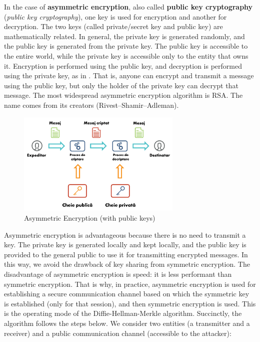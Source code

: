 In the case of \textbf{asymmetric encryption}, also called \textbf{public key cryptography} (\textit{public key cryptography}), one key is used for encryption and another for decryption.
The two keys (called private/secret key and public key) are mathematically related.
In general, the private key is generated randomly, and the public key is generated from the private key.
The public key is accessible to the entire world, while the private key is accessible only to the entity that owns it.
Encryption is performed using the public key, and decryption is performed using the private key, as in .
That is, anyone can encrypt and transmit a message using the public key, but only the holder of the private key can decrypt that message.
The most widespread asymmetric encryption algorithm is RSA.
The name comes from its creators (Rivest–Shamir–Adleman).

\begin{figure}[htbp]
  \centering
  \def\svgwidth{\columnwidth}
  \includegraphics[width=0.7\textwidth]{chapters/12-auth/img/asymmetric-encryption.svg.pdf}
  \caption{Asymmetric Encryption (with public keys)}
  \label{fig:sec:asymmetric-encryption}
\end{figure}

Asymmetric encryption is advantageous because there is no need to transmit a key.
The private key is generated locally and kept locally, and the public key is provided to the general public to use it for transmitting encrypted messages.
In this way, we avoid the drawback of key sharing from symmetric encryption.
The disadvantage of asymmetric encryption is speed: it is less performant than symmetric encryption.
That is why, in practice, asymmetric encryption is used for establishing a secure communication channel based on which the symmetric key is established (only for that session), and then symmetric encryption is used.
This is the operating mode of the Diffie-Hellman-Merkle algorithm.
Succinctly, the algorithm follows the steps below.
We consider two entities (a transmitter and a receiver) and a public communication channel (accessible to the attacker):

